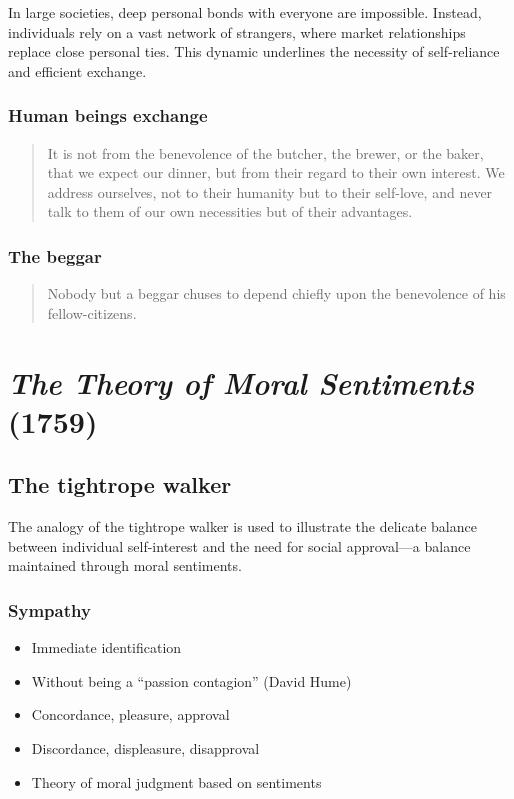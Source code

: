             In large societies, deep personal bonds with everyone are impossible. Instead, individuals rely on a vast network of strangers, where market relationships replace close personal ties. This dynamic underlines the necessity of self-reliance and efficient exchange.

        \subsubsection{Human beings exchange}

            \begin{quote}
                It is not from the benevolence of the butcher, the brewer, or the baker, that we expect our dinner, but from their regard to their own interest. We address ourselves, not to their humanity but to their self-love, and never talk to them of our own necessities but of their advantages.
            \end{quote}

        \subsubsection{The beggar}

            \begin{quote}
                Nobody but a beggar chuses to depend chiefly upon the benevolence of his fellow-citizens.
            \end{quote}

\section{\textit{The Theory of Moral Sentiments} (1759)}

    \subsection{The tightrope walker}

        The analogy of the tightrope walker is used to illustrate the delicate balance between individual self-interest and the need for social approval—a balance maintained through moral sentiments.

        \subsubsection{Sympathy}

            \begin{itemize}
                \item Immediate identification
                \item Without being a “passion contagion” (David Hume)
                \item Concordance, pleasure, approval
                \item Discordance, displeasure, disapproval
                \item Theory of moral judgment based on sentiments
            \end{itemize}

